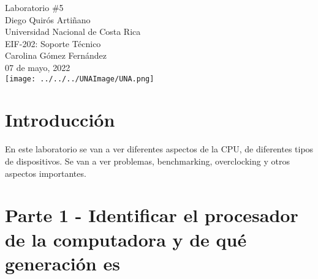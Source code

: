 \documentclass[stu, 12pt, letterpaper, donotrepeattitle, floatsintext, natbib, helv]{apa7}
\begin{document}
\begin{titlepage}
    \centering
    \vfill
    \LARGE Laboratorio \#5\\
    \vskip2cm
    \large Diego Quirós Artiñano \\
    Universidad Nacional de Costa Rica \\
    EIF-202: Soporte Técnico \\ 
    Carolina Gómez Fernández \\
    07 de mayo, 2022 \\
    \vfill
    \texttt{[image: ../../../UNAImage/UNA.png]} \\
    \vfill
    \vfill
\end{titlepage}

\addto{}
\tableofcontents
\setcounter{tocdepth}{2}
\newpage


\section*{Introducción}
{}
En este laboratorio se van a ver diferentes aspectos de la CPU, de diferentes tipos de dispositivos. Se van a ver problemas, benchmarking, overclocking y otros aspectos importantes.

\section*{Parte 1 - Identificar el procesador de la computadora y de qué generación es}
{}
\end{document}
